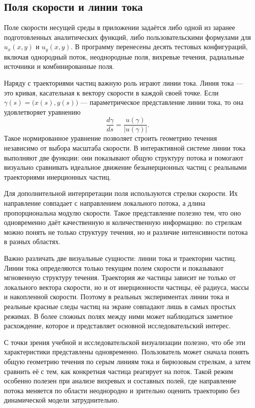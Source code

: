 \documentclass[14pt,a4paper]{extarticle}
\numberwithin{figure}{section}
\numberwithin{table}{section}
\begin{document}
\subsection{Поля скорости и линии тока}

Поле скорости несущей среды в приложении задаётся либо одной из заранее
подготовленных аналитических функций, либо пользовательскими формулами для
$u_x(x, y)$ и $u_y(x, y)$. В программу перенесены десять тестовых конфигураций,
включая однородный поток, неоднородные поля, вихревые течения, радиальные
источники и комбинированные поля.

Наряду с траекториями частиц важную роль играют линии тока. Линия тока --- это
кривая, касательная к вектору скорости в каждой своей точке. Если
$\gamma(s) = \bigl(x(s), y(s)\bigr)$ --- параметрическое представление линии тока,
то она удовлетворяет уравнению
\begin{equation}
    \frac{d\gamma}{ds} = \frac{u(\gamma)}{|u(\gamma)|}.
\end{equation}
Такое нормированное уравнение позволяет строить геометрию течения независимо от
выбора масштаба скорости. В интерактивной системе линии тока выполняют две
функции: они показывают общую структуру потока и помогают визуально сравнивать
идеальное движение безынерционных частиц с реальными траекториями инерционных
частиц.

Для дополнительной интерпретации поля используются стрелки скорости. Их
направление совпадает с направлением локального потока, а длина пропорциональна
модулю скорости. Такое представление полезно тем, что оно одновременно даёт
качественную и количественную информацию: по стрелкам можно понять не только
структуру течения, но и различие интенсивности потока в разных областях.

Важно различать две визуальные сущности: линии тока и траектории частиц. Линии
тока определяются только текущим полем скорости и показывают мгновенную структуру
течения. Траектория же частицы зависит не только от локального вектора скорости,
но и от инерционности частицы, её радиуса, массы и накопленной скорости. Поэтому
в реальных экспериментах линии тока и реальные красные следы частиц на экране
совпадают лишь в самых простых режимах. В более сложных полях между ними может
наблюдаться заметное расхождение, которое и представляет основной исследовательский
интерес.

С точки зрения учебной и исследовательской визуализации полезно, что обе эти
характеристики представлены одновременно. Пользователь может сначала понять общую
геометрию течения по серым линиям тока и бирюзовым стрелкам, а затем сравнить её
с тем, как конкретная частица реагирует на поток. Такой режим особенно полезен
при анализе вихревых и составных полей, где направление потока меняется по области
неоднородно и зрительно оценить траекторию без динамической модели затруднительно.
\end{document}
